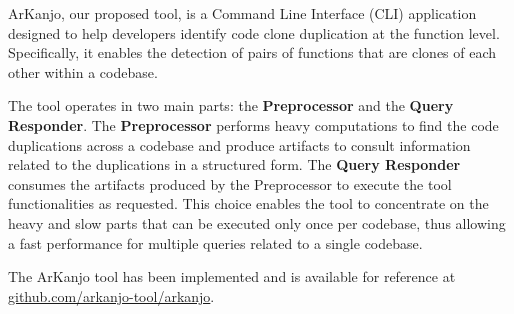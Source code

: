 \en

ArKanjo, our proposed tool, is a Command Line Interface (CLI) application designed to
help developers identify code clone duplication at the function level.
Specifically, it enables the detection of pairs of functions that are clones of 
each other within a codebase.

The tool operates in two main parts: the \textbf{Preprocessor} and the \textbf{Query Responder}. 
The \textbf{Preprocessor} performs heavy computations to find the code 
duplications across a codebase and produce artifacts to consult information related to the 
duplications in a structured form. The \textbf{Query Responder} consumes the artifacts produced 
by the Preprocessor to execute the tool functionalities as requested. This choice enables the 
tool to concentrate on the heavy and slow parts that can be executed only once per codebase, 
thus allowing a fast performance for multiple queries related to a single codebase.

The ArKanjo tool has been implemented and is available for reference at
\url{github.com/arkanjo-tool/arkanjo}.
